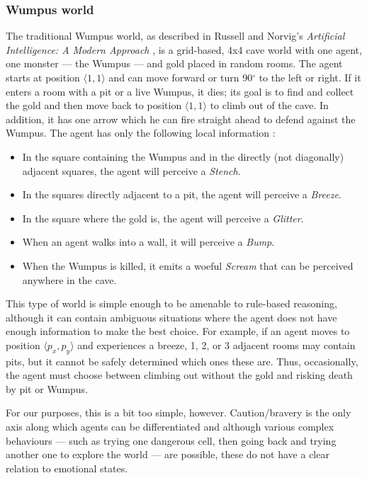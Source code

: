 
\subsubsection{Wumpus world}

The traditional Wumpus world, as described in Russell and Norvig's {\em Artificial Intelligence: A Modern Approach} \cite[p. 236]{norvig}, is a grid-based, 4x4 cave world with one agent, one monster --- the Wumpus --- and gold placed in random rooms. The agent starts at position $\langle 1,1\rangle$ and can move forward or turn 90$^\circ$ to the left or right. If it enters a room with a pit or a live Wumpus, it dies; its goal is to find and collect the gold and then move back to position $\langle 1,1\rangle$ to climb out of the cave. In addition, it has one arrow which he can fire straight ahead to defend against the Wumpus. The agent has only the following local information \cite[p. 237]{norvig}:
\begin{itemize}
	\item In the square containing the Wumpus and in the directly (not diagonally) adjacent squares, the agent will perceive a {\em Stench}.
	\item In the squares directly adjacent to a pit, the agent will perceive a {\em Breeze}.
	\item In the square where the gold is, the agent will perceive a {\em Glitter}.
	\item When an agent walks into a wall, it will perceive a {\em Bump}.
	\item When the Wumpus is killed, it emits a woeful {\em Scream} that can be perceived anywhere in the cave.
\end{itemize}

This type of world is simple enough to be amenable to rule-based reasoning, although it can contain ambiguous situations where the agent does not have enough information to make the best choice. For example, if an agent moves to position $\langle p_x,p_y \rangle$ and experiences a breeze, 1, 2, or 3 adjacent rooms may contain pits, but it cannot be safely determined which ones these are. Thus,  occasionally, the agent must choose between climbing out without the gold and risking death by pit or Wumpus.

For our purposes, this is a bit too simple, however. Caution/bravery is the only axis along which agents can be differentiated and although various complex behaviours --- such as trying one dangerous cell, then going back and trying another one to explore the world --- are possible, these do not have a clear relation to emotional states.


